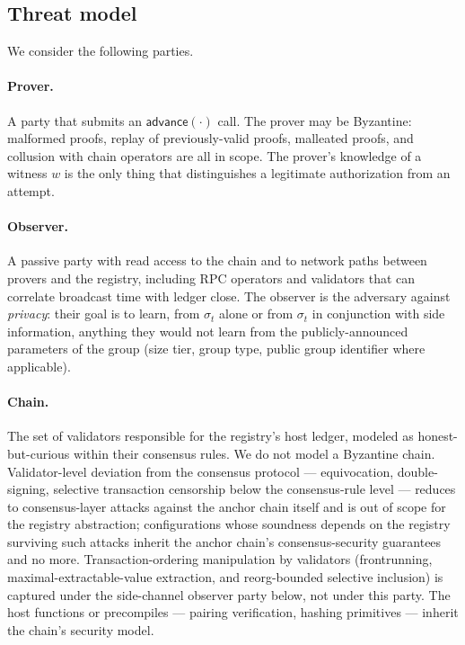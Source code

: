 \subsection{Threat model}

We consider the following parties.

\paragraph{Prover.} A party that submits an
$\mathsf{advance}(\cdot)$ call. The prover may be Byzantine: malformed
proofs, replay of previously-valid proofs, malleated proofs, and
collusion with chain operators are all in scope. The prover's
knowledge of a witness $w$ is the only thing that distinguishes a
legitimate authorization from an attempt.

\paragraph{Observer.} A passive party with read access to the chain
and to network paths between provers and the registry, including RPC
operators and validators that can correlate broadcast time with
ledger close. The observer is the adversary against \emph{privacy}:
their goal is to learn, from $\sigma_t$ alone or from $\sigma_t$ in
conjunction with side information, anything they would not learn from
the publicly-announced parameters of the group (size tier, group
type, public group identifier where applicable).

\paragraph{Chain.} The set of validators responsible for the registry's
host ledger, modeled as honest-but-curious within their consensus
rules. We do not model a Byzantine chain. Validator-level deviation
from the consensus protocol --- equivocation, double-signing,
selective transaction censorship below the consensus-rule level ---
reduces to consensus-layer attacks against the anchor chain itself
and is out of scope for the registry abstraction; configurations
whose soundness depends on the registry surviving such attacks
inherit the anchor chain's consensus-security guarantees and no
more. Transaction-ordering manipulation by validators (frontrunning,
maximal-extractable-value extraction, and reorg-bounded selective
inclusion) is captured under the side-channel observer party below,
not under this party. The host functions or precompiles ---
pairing verification, hashing primitives --- inherit the chain's
security model.

